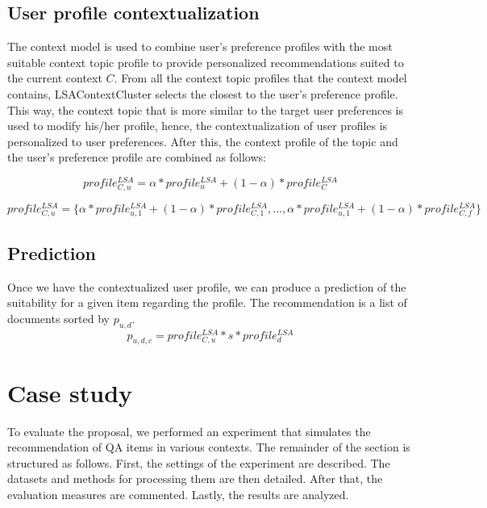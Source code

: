 \documentclass[preprint]{elsarticle}
\begin{document}
\begin{spacing}{1.5}
\subsection{User profile contextualization}

The context model is used to combine user's preference profiles with the most suitable context topic profile to provide personalized recommendations suited to the current context $C$. From all the context topic profiles that the context model contains, LSAContextCluster selects the closest to the user's preference profile. This way, the context topic that is more similar to the target user preferences is used to modify his/her profile, hence, the contextualization of user profiles is personalized to user preferences. After this, the context profile of the topic and the user's preference profile are combined as follows:

\begin{equation}
	profile^{LSA}_{C,u} = \alpha * profile^{LSA}_u + (1- \alpha )*profile^{LSA}_{C}
\end{equation}

\begin{equation}
	profile^{LSA}_{C,u} = \{ \alpha * profile^{LSA}_{u,1} + (1- \alpha ) * profile^{LSA}_{C,1},\dots, \alpha * profile^{LSA}_{u,1} + ( 1 - \alpha ) * profile^{LSA}_{C,f} \}
\end{equation}

\subsection{Prediction}

Once we have the contextualized user profile, we can produce a prediction of the suitability for a given item regarding the profile. The recommendation is a list of documents sorted by $p_{u,d}$.\begin{equation}
	p_{u,d,c} = profile^{LSA}_{C,u}*s*profile^{LSA}_d
\end{equation}

\section{Case study}
\label{sec:case-study}

To evaluate the proposal, we performed an experiment that simulates the recommendation of QA items in various contexts. The remainder of the section is structured as follows. First, the settings of the experiment are described. The datasets and methods for processing them are then detailed. After that, the evaluation measures are commented. Lastly, the results are analyzed.


\end{spacing}
\end{document}
